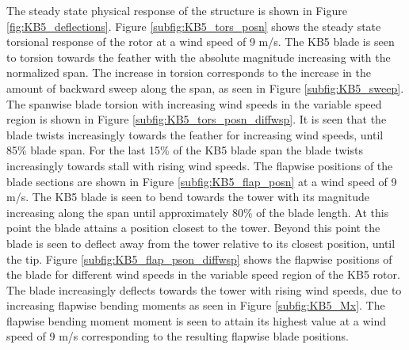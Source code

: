 The steady state physical response of the structure is shown in Figure \ref{fig:KB5_deflections}. Figure \ref{subfig:KB5_tors_posn} shows the steady state torsional response of the rotor at a wind speed of 9 m/s. The KB5 blade is seen to torsion towards the feather with the absolute magnitude increasing with the normalized span. The increase in torsion corresponds to the increase in the amount of backward sweep along the span, as seen in Figure \ref{subfig:KB5_sweep}. The spanwise blade torsion with increasing wind speeds in the variable speed region is shown in Figure \ref{subfig:KB5_tors_posn_diffwsp}. It is seen that the blade twists increasingly towards the feather for increasing wind speeds, until 85\% blade span. For the last 15\% of the KB5 blade span the blade twists increasingly towards stall with rising wind speeds. %
The flapwise positions of the blade sections are shown in Figure \ref{subfig:KB5_flap_posn} at a wind speed of 9 m/s. The KB5 blade is seen to bend towards the tower with its magnitude increasing along the span until approximately 80\% of the blade length. At this point the blade attains a position closest to the tower. Beyond this point the blade is seen to deflect away from the tower relative to its closest position, until the tip. %
Figure \ref{subfig:KB5_flap_pson_diffwsp} shows the flapwise positions of the blade for different wind speeds in the variable speed region of the KB5 rotor. The blade increasingly deflects towards the tower with rising wind speeds, due to increasing flapwise bending moments as seen in Figure \ref{subfig:KB5_Mx}. The flapwise bending moment moment is seen to attain its highest value at a wind speed of 9 m/s corresponding to the resulting flapwise blade positions.

